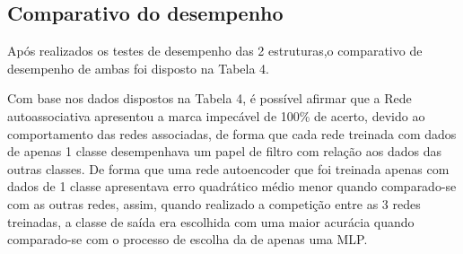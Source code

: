 \subsection{Comparativo do desempenho}
Após realizados os testes de desempenho das 2 estruturas,o comparativo de desempenho de ambas foi disposto na Tabela 4.

Com base nos dados dispostos na Tabela 4, é possível afirmar que a Rede autoassociativa apresentou a marca impecável de 100\% de acerto, devido ao comportamento das redes associadas, de forma que cada rede treinada com dados de apenas 1 classe desempenhava um papel de filtro com relação aos dados das outras classes. De forma que uma rede autoencoder que foi treinada apenas com dados de 1 classe apresentava erro quadrático médio menor quando comparado-se com as outras redes, assim, quando realizado a competição entre as 3 redes treinadas, a classe de saída era escolhida com uma maior acurácia quando comparado-se com o processo de escolha da de apenas uma MLP.